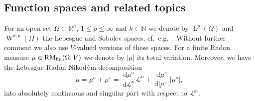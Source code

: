 \documentclass[a4paper,10pt,reqno,oneside]{amsart}
\numberwithin{equation}{section}
\newcommand{\R}{\mathbb R}
\newcommand{\N}{\mathbb N}
\newcommand{\Leb}{\mathscr{L}}
\newcommand{\lebe}{\operatorname{L}}
\newcommand{\sobo}{\operatorname{W}}
\newcommand{\dx}[1]{\,\mathrm{d}#1}
\newcommand{\abs}[1]{\left\lvert#1\right\rvert}
\begin{document}
\subsection{Function spaces and related topics} For an open set $\Omega\subset\R^n$, $1\leq p\leq \infty$ and $k\in\N$ we denote by $\lebe^p(\Omega)$ and $\sobo^{k,p}(\Omega)$ the Lebesgue and Sobolev spaces, cf.~e.g.~\cite{Giusti}. Without further comment we also use $V$-valued versions of these spaces. For a finite Radon measure $\mu\in\mathrm{RM}_{\rm fin}(\Omega;V)$ we denote by $\abs{\mu}$ its total variation. Moreover, we have the Lebesgue-Radon-Nikod\'ym decomposition 
\begin{equation}\label{eq:LebesgueRadonNikodym}
	\mu = \mu^a + \mu^s = \frac{\dx{\mu^a}}{\dx{\Leb^n}}\Leb^n + \frac{\dx{\mu^s}}{\dx{\abs{\mu^s}}}\abs{\mu^s},
\end{equation}
into absolutely continuous and singular part with respect to $\Leb^n$. 
\end{document}
